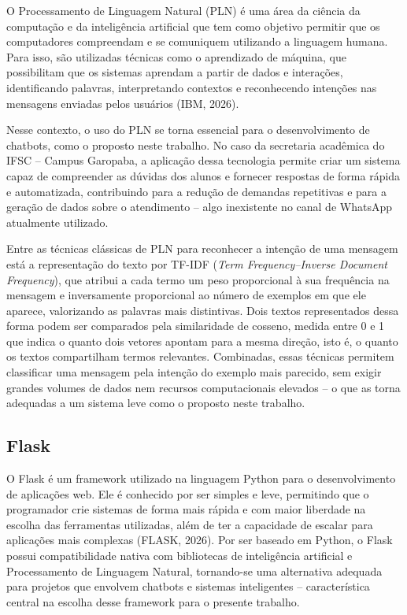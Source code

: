\documentclass[12pt]{article}
\begin{document}
O Processamento de Linguagem Natural (PLN) é uma área da ciência da
computação e da inteligência artificial que tem como objetivo permitir
que os computadores compreendam e se comuniquem utilizando a linguagem
humana. Para isso, são utilizadas técnicas como o aprendizado de máquina,
que possibilitam que os sistemas aprendam a partir de dados e interações,
identificando palavras, interpretando contextos e reconhecendo intenções
nas mensagens enviadas pelos usuários (IBM, 2026).

Nesse contexto, o uso do PLN se torna essencial para o desenvolvimento de
chatbots, como o proposto neste trabalho. No caso da secretaria acadêmica
do IFSC -- Campus Garopaba, a aplicação dessa tecnologia permite criar um
sistema capaz de compreender as dúvidas dos alunos e fornecer respostas
de forma rápida e automatizada, contribuindo para a redução de demandas
repetitivas e para a geração de dados sobre o atendimento -- algo
inexistente no canal de WhatsApp atualmente utilizado.

Entre as técnicas clássicas de PLN para reconhecer a intenção de uma
mensagem está a representação do texto por TF-IDF (\textit{Term
Frequency--Inverse Document Frequency}), que atribui a cada termo um peso
proporcional à sua frequência na mensagem e inversamente proporcional ao
número de exemplos em que ele aparece, valorizando as palavras mais
distintivas. Dois textos representados dessa forma podem ser comparados
pela similaridade de cosseno, medida entre 0 e 1 que indica o quanto dois
vetores apontam para a mesma direção, isto é, o quanto os textos
compartilham termos relevantes. Combinadas, essas técnicas permitem
classificar uma mensagem pela intenção do exemplo mais parecido, sem
exigir grandes volumes de dados nem recursos computacionais elevados -- o
que as torna adequadas a um sistema leve como o proposto neste trabalho.

\subsection{Flask}\label{sec:flask}

O Flask é um framework utilizado na linguagem Python para o
desenvolvimento de aplicações web. Ele é conhecido por ser simples e
leve, permitindo que o programador crie sistemas de forma mais rápida e
com maior liberdade na escolha das ferramentas utilizadas, além de ter a
capacidade de escalar para aplicações mais complexas (FLASK, 2026). Por
ser baseado em Python, o Flask possui compatibilidade nativa com
bibliotecas de inteligência artificial e Processamento de Linguagem
Natural, tornando-se uma alternativa adequada para projetos que envolvem
chatbots e sistemas inteligentes -- característica central na escolha
desse framework para o presente trabalho.
\end{document}
